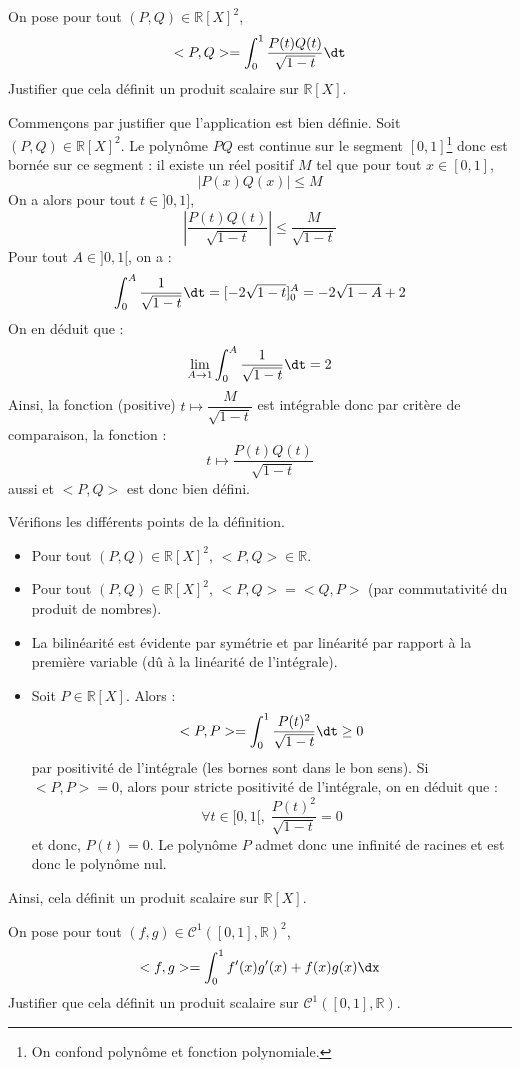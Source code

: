\documentclass[a4paper,10pt]{report}
\begin{document}
\begin{Exercice}{}\label{PS} On pose pour tout $(P,Q) \in \mathbb{R}[X]^2$,
$$ <P,Q> = \int_{0}^1 \dfrac{P(t)Q(t)}{\sqrt{1-t}} \dt $$
Justifier que cela définit un produit scalaire sur $\mathbb{R}[X]$.
\end{Exercice}

\corr Commençons par justifier que l'application est bien définie. Soit $(P,Q) \in \mathbb{R}[X]^2$. Le polynôme $PQ$ est continue sur le segment $[0,1]$\footnote{On confond polynôme et fonction polynomiale.} donc est bornée sur ce segment : il existe un réel positif $M$ tel que pour tout $x \in [0,1]$,
$$ \vert P(x)Q(x) \vert \leq M$$
On a alors pour tout $t \in ]0,1]$,
$$ \left\vert  \dfrac{P(t)Q(t)}{\sqrt{1-t}} \right\vert \leq \dfrac{M}{\sqrt{1-t}}$$
Pour tout $A \in ]0,1[$, on a :
$$ \int_{0}^A \dfrac{1}{\sqrt{1-t}} \dt = [-2 \sqrt{1-t}]_0^A = - 2 \sqrt{1-A}+2$$
On en déduit que :
$$ \lim_{A \rightarrow 1}  \int_{0}^A \dfrac{1}{\sqrt{1-t}} \dt = 2$$
Ainsi, la fonction (positive) $t \mapsto \dfrac{M}{\sqrt{1-t}}$ est intégrable donc par critère de comparaison, la fonction :
$$ t \mapsto  \dfrac{P(t)Q(t)}{\sqrt{1-t}} $$
aussi et $<P,Q>$ est donc bien défini.

\medskip

\noindent Vérifions les différents points de la définition.

\begin{itemize}
\item Pour tout $(P,Q) \in \mathbb{R}[X]^2$, $<P,Q> \in \mathbb{R}$.
\item Pour tout $(P,Q) \in \mathbb{R}[X]^2$, $<P,Q>= <Q,P>$ (par commutativité du produit de nombres).
\item La bilinéarité est évidente par symétrie et par linéarité par rapport à la première variable (dû à la linéarité de l'intégrale).
\item Soit $P \in \mathbb{R}[X]$. Alors :
$$ <P,P> =\int_0^1 \dfrac{P(t)^2}{\sqrt{1-t}} \dt \geq 0$$
par positivité de l'intégrale (les bornes sont dans le bon sens). Si $<P,P>=0$, alors pour stricte positivité de l'intégrale, on en déduit que :
$$ \forall t \in [0,1[, \; \dfrac{P(t)^2}{\sqrt{1-t}}=0$$
et donc, $P(t)=0$. Le polynôme $P$ admet donc une infinité de racines et est donc le polynôme nul. 
\end{itemize}
Ainsi, cela définit un produit scalaire sur $\mathbb{R}[X]$.


\begin{Exercice}{} \label{PS2} On pose pour tout $(f,g) \in \mathcal{C}^1([0,1],\mathbb{R})^2$,
$$ <f,g> = \int_{0}^1 f'(x)g'(x)+f(x)g(x) \dx$$
Justifier que cela définit un produit scalaire sur $\mathcal{C}^1([0,1],\mathbb{R})$.
\end{Exercice} 
\end{document}

